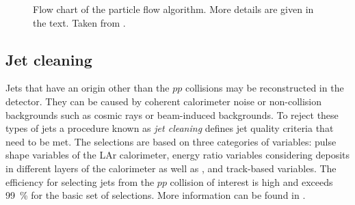 \FloatBarrier
\begin{figure}[t]
    \caption{Flow chart of the particle flow algorithm. More details are given in the text. Taken from .}
    \label{fig:pflow-algorithm}
\end{figure}


\subsection{Jet cleaning}
Jets that have an origin other than the $pp$ collisions may be reconstructed in the detector. They can be caused by coherent calorimeter noise or non-collision backgrounds such as cosmic rays or beam-induced backgrounds. To reject these types of jets a procedure known as \emph{jet cleaning} defines jet quality criteria that need to be met. The selections are based on three categories of variables: pulse shape variables of the LAr calorimeter, energy ratio variables considering deposits in different layers of the calorimeter as well as \fEM, and track-based variables. The efficiency for selecting jets from the $pp$ collision of interest is high and exceeds \SI{99}{\percent} for the basic set of selections. More information can be found in .


